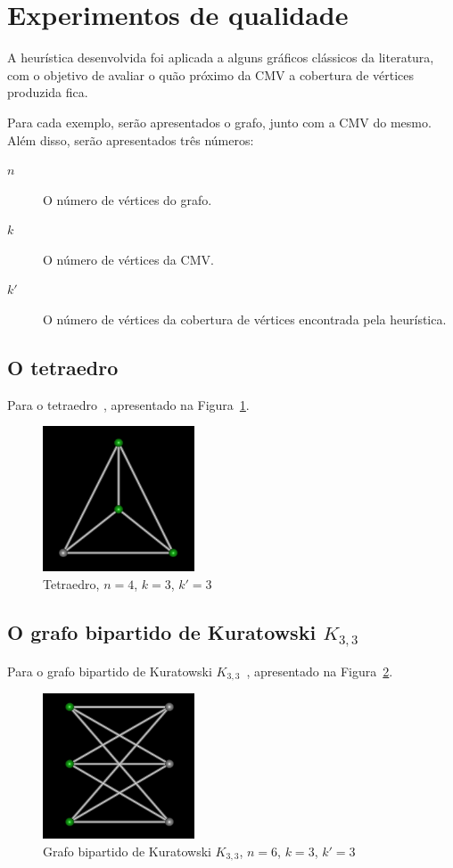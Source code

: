 \section{Experimentos de qualidade}
\label{sec:experimentos-qualidade}
A heurística desenvolvida foi aplicada a alguns gráficos clássicos da
literatura, com o objetivo de avaliar o quão próximo da CMV a
cobertura de vértices produzida fica.

Para cada exemplo, serão apresentados o grafo, junto com a
CMV do mesmo. Além disso, serão apresentados três números:
\begin{description}
    \item[$n$] O número de vértices do grafo.
    \item[$k$] O número de vértices da CMV.
    \item[$k'$] O número de vértices da cobertura de vértices
    encontrada pela heurística.
\end{description}

\subsection{O tetraedro}
Para o tetraedro~\cite{cite:example-plato},
apresentado na Figura~\ref{fig:example-tetraedro}.

\begin{figure}[htb]
\centering
\includegraphics[width=0.4\textwidth]{img/tetraedro.png}
\caption{Tetraedro, $n=4$, $k=3$, $k'=3$}
\label{fig:example-tetraedro}
\end{figure}

\subsection{O grafo bipartido de Kuratowski $K_{3,3}$}
Para o grafo bipartido de Kuratowski
$K_{3,3}$~\cite{cite:example-kuratowski},
apresentado na Figura~\ref{fig:example-kuratowski}.

\begin{figure}[htb]
\centering
\includegraphics[width=0.4\textwidth]{img/kuratowski.png}
\caption{Grafo bipartido de Kuratowski $K_{3,3}$, $n=6$, $k=3$, $k'=3$}
\label{fig:example-kuratowski}
\end{figure}


